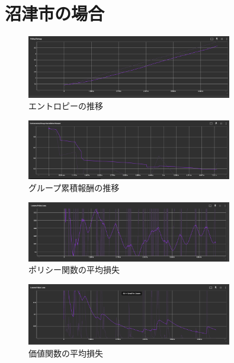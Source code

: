 \section{沼津市の場合}
\begin{figure}[H] 
  \centering 
  \includegraphics[width=0.8\textwidth]{Figures/NumazuSearch-Entropy.png}
  \caption{エントロピーの推移} 
  \label{fig:fig-01}
\end{figure}
\begin{figure}[H] 
  \centering 
  \includegraphics[width=0.8\textwidth]{Figures/NumazuSearch-GroupReward.png}
  \caption{グループ累積報酬の推移} 
  \label{fig:fig-01}
\end{figure}
\begin{figure}[H] 
  \centering 
  \includegraphics[width=0.8\textwidth]{Figures/NumazuSearch-PolicyLoss.png}
  \caption{ポリシー関数の平均損失} 
  \label{fig:fig-01}
\end{figure}
\begin{figure}[H] 
  \centering 
  \includegraphics[width=0.8\textwidth]{Figures/NumazuSearch-ValueLoss.png}
  \caption{価値関数の平均損失} 
  \label{fig:fig-01}
\end{figure}

